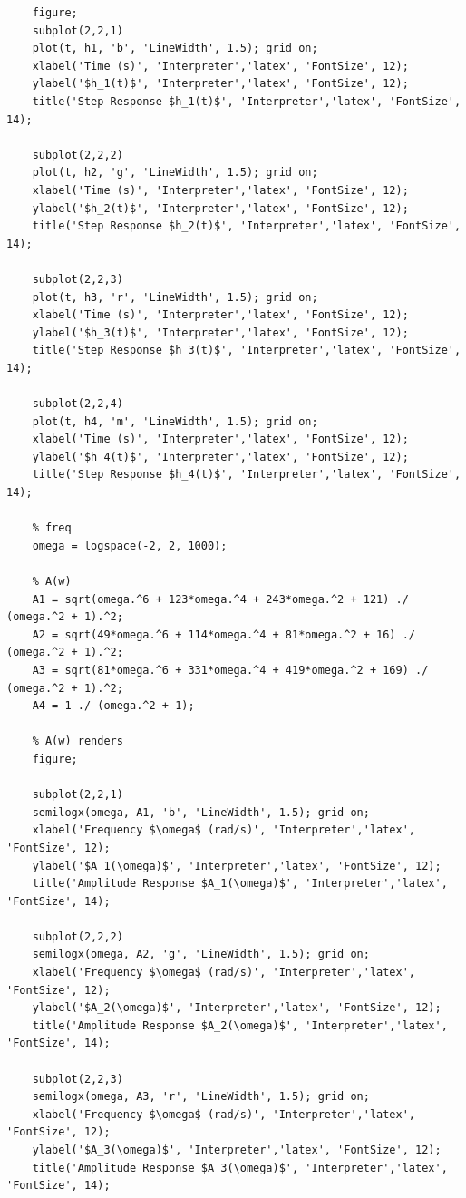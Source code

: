 \documentclass[a4paper, 12pt]{article}
\begin{document}
\begin{lstlisting}[label=task1, caption={Программа для задания 1}]
    % h(t) renders
    figure;
    subplot(2,2,1)
    plot(t, h1, 'b', 'LineWidth', 1.5); grid on;
    xlabel('Time (s)', 'Interpreter','latex', 'FontSize', 12);
    ylabel('$h_1(t)$', 'Interpreter','latex', 'FontSize', 12);
    title('Step Response $h_1(t)$', 'Interpreter','latex', 'FontSize', 14);

    subplot(2,2,2)
    plot(t, h2, 'g', 'LineWidth', 1.5); grid on;
    xlabel('Time (s)', 'Interpreter','latex', 'FontSize', 12);
    ylabel('$h_2(t)$', 'Interpreter','latex', 'FontSize', 12);
    title('Step Response $h_2(t)$', 'Interpreter','latex', 'FontSize', 14);

    subplot(2,2,3)
    plot(t, h3, 'r', 'LineWidth', 1.5); grid on;
    xlabel('Time (s)', 'Interpreter','latex', 'FontSize', 12);
    ylabel('$h_3(t)$', 'Interpreter','latex', 'FontSize', 12);
    title('Step Response $h_3(t)$', 'Interpreter','latex', 'FontSize', 14);

    subplot(2,2,4)
    plot(t, h4, 'm', 'LineWidth', 1.5); grid on;
    xlabel('Time (s)', 'Interpreter','latex', 'FontSize', 12);
    ylabel('$h_4(t)$', 'Interpreter','latex', 'FontSize', 12);
    title('Step Response $h_4(t)$', 'Interpreter','latex', 'FontSize', 14);

    % freq
    omega = logspace(-2, 2, 1000);

    % A(w)
    A1 = sqrt(omega.^6 + 123*omega.^4 + 243*omega.^2 + 121) ./ (omega.^2 + 1).^2;
    A2 = sqrt(49*omega.^6 + 114*omega.^4 + 81*omega.^2 + 16) ./ (omega.^2 + 1).^2;
    A3 = sqrt(81*omega.^6 + 331*omega.^4 + 419*omega.^2 + 169) ./ (omega.^2 + 1).^2;
    A4 = 1 ./ (omega.^2 + 1);

    % A(w) renders
    figure;

    subplot(2,2,1)
    semilogx(omega, A1, 'b', 'LineWidth', 1.5); grid on;
    xlabel('Frequency $\omega$ (rad/s)', 'Interpreter','latex', 'FontSize', 12);
    ylabel('$A_1(\omega)$', 'Interpreter','latex', 'FontSize', 12);
    title('Amplitude Response $A_1(\omega)$', 'Interpreter','latex', 'FontSize', 14);

    subplot(2,2,2)
    semilogx(omega, A2, 'g', 'LineWidth', 1.5); grid on;
    xlabel('Frequency $\omega$ (rad/s)', 'Interpreter','latex', 'FontSize', 12);
    ylabel('$A_2(\omega)$', 'Interpreter','latex', 'FontSize', 12);
    title('Amplitude Response $A_2(\omega)$', 'Interpreter','latex', 'FontSize', 14);

    subplot(2,2,3)
    semilogx(omega, A3, 'r', 'LineWidth', 1.5); grid on;
    xlabel('Frequency $\omega$ (rad/s)', 'Interpreter','latex', 'FontSize', 12);
    ylabel('$A_3(\omega)$', 'Interpreter','latex', 'FontSize', 12);
    title('Amplitude Response $A_3(\omega)$', 'Interpreter','latex', 'FontSize', 14);


\end{lstlisting}
\end{document}
